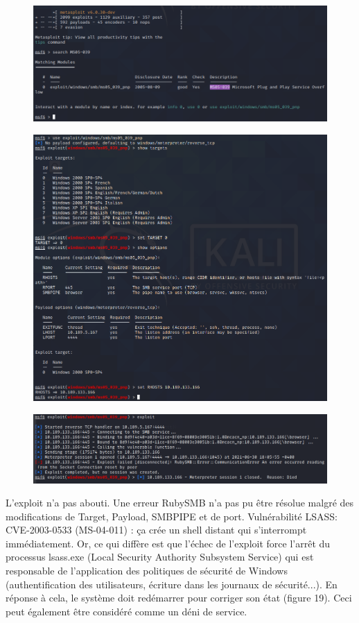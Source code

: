 \documentclass[12pt, oneside]{article}
\begin{document}
\begin{figure}[H]
\centering
\includegraphics[scale=0.4]{Image3}
\end{figure}
\begin{figure}[H]
\centering
\includegraphics[scale=0.4]{Image4}
\end{figure}
\begin{figure}[H]
\centering
\includegraphics[scale=0.4]{Image5}
\end{figure}
L’exploit n’a pas abouti. Une erreur RubySMB n’a pas pu être résolue malgré des modifications de Target, Payload, SMBPIPE et de port.
Vulnérabilité LSASS: CVE-2003-0533 (MS-04-011) : ça crée un shell distant qui s'interrompt immédiatement. Or, ce qui diffère est que l’échec de l’exploit force l’arrêt du processus lsass.exe (Local Security Authority Subsystem Service) qui est responsable de l’application des politiques de sécurité de Windows (authentification des utilisateurs, écriture dans les journaux de sécurité...). En réponse à cela, le système doit redémarrer pour corriger son état (figure 19). Ceci peut également être considéré comme un déni de service.
\end{document}
